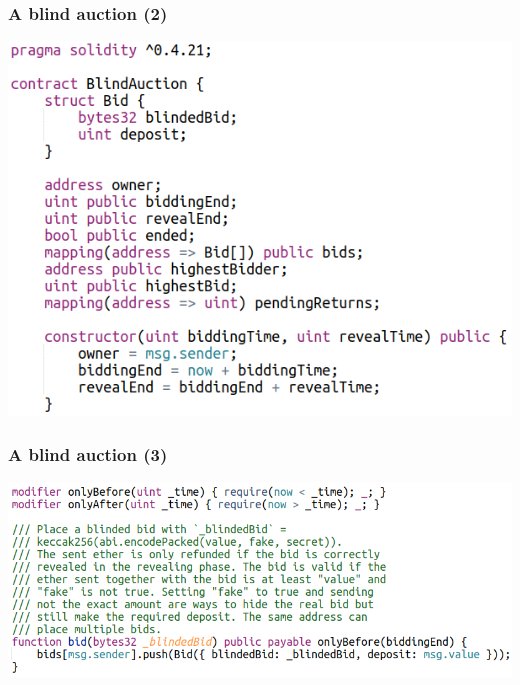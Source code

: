\documentclass[11pt]{beamer}  %
\begin{document}
\begin{frame}\frametitle{A blind auction (2)}

  \begin{center}
    \includegraphics[scale=0.5,clip=false]{pictures/blind-auction-1.png}
  \end{center}

\end{frame}

\begin{frame}\frametitle{A blind auction (3)}

  \begin{center}
    \includegraphics[scale=0.42,clip=false]{pictures/blind-auction-2.png}
  \end{center}

\end{frame}
\end{document}
